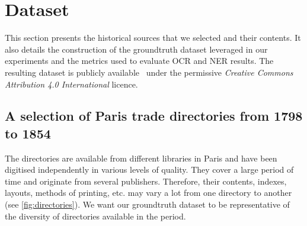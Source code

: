 \section{Dataset}
\label{sec:dataset}






This section presents the historical sources that we selected and their contents.
It also details the construction of the groundtruth dataset leveraged in our experiments and the metrics used to evaluate OCR and NER results.
The resulting dataset is publicly available~\cite{abadie_dataset_22} under the permissive \emph{Creative Commons Attribution 4.0 International} licence.

\subsection{A selection of Paris trade directories from 1798 to 1854}
\label{sec:corpus}

The directories are available from different libraries in Paris and have been digitised independently in various levels of quality. 
They cover a large period of time and originate from several publishers.
Therefore, their contents, indexes, layouts, methods of printing, etc. may vary a lot from one directory to another (see \cref{fig:directories}).
We want our groundtruth dataset to be representative of the diversity of directories available in the period.

